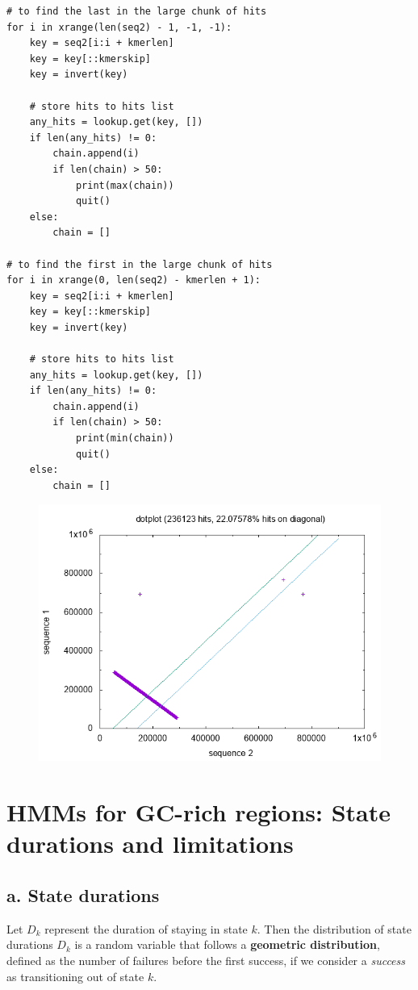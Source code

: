 \documentclass[a4paper]{article}
\begin{document}
\begin{verbatim}
# to find the last in the large chunk of hits
for i in xrange(len(seq2) - 1, -1, -1):
    key = seq2[i:i + kmerlen]
    key = key[::kmerskip]
    key = invert(key)

    # store hits to hits list
    any_hits = lookup.get(key, [])
    if len(any_hits) != 0:
        chain.append(i)
        if len(chain) > 50:
            print(max(chain))
            quit()
    else:
        chain = []

# to find the first in the large chunk of hits
for i in xrange(0, len(seq2) - kmerlen + 1):
    key = seq2[i:i + kmerlen]
    key = key[::kmerskip]
    key = invert(key)

    # store hits to hits list
    any_hits = lookup.get(key, [])
    if len(any_hits) != 0:
        chain.append(i)
        if len(chain) > 50:
            print(min(chain))
            quit()
    else:
        chain = []
\end{verbatim}

\begin{figure}
\includegraphics[width=\textwidth]{./human-hoxa-inverted.png}
\end{figure}

\section{HMMs for GC-rich regions: State durations and limitations}

\subsection*{a. State durations}
Let $D_k$ represent the duration of staying in state $k$. Then the
distribution of state durations $D_k$ is a random variable that follows a
{\bf geometric distribution}, defined as the number of failures
before the first success, if we consider a {\it success} as transitioning out of 
state $k$.
\end{document}
